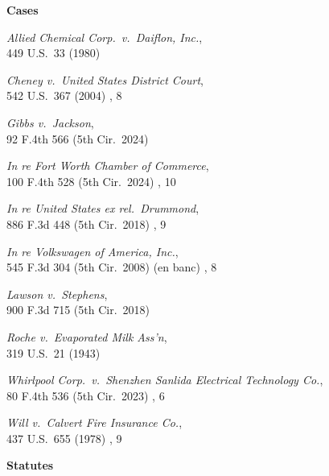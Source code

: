 \documentclass[14pt]{extarticle}
\begin{document}
\begin{singlespace}
\noindent\textbf{Cases}

\vspace{0.35em}
\noindent\textit{Allied Chemical Corp.\ v.\ Daiflon, Inc.},\\
\hspace{1.2em}449 U.S.\ 33 (1980) 

\noindent\textit{Cheney v.\ United States District Court},\\
\hspace{1.2em}542 U.S.\ 367 (2004) , 8

\noindent\textit{Gibbs v.\ Jackson},\\
\hspace{1.2em}92 F.4th 566 (5th Cir.\ 2024) 

\noindent\textit{In re Fort Worth Chamber of Commerce},\\
\hspace{1.2em}100 F.4th 528 (5th Cir.\ 2024) , 10

\noindent\textit{In re United States ex rel.\ Drummond},\\
\hspace{1.2em}886 F.3d 448 (5th Cir.\ 2018) , 9

\noindent\textit{In re Volkswagen of America, Inc.},\\
\hspace{1.2em}545 F.3d 304 (5th Cir.\ 2008) (en banc) , 8

\noindent\textit{Lawson v.\ Stephens},\\
\hspace{1.2em}900 F.3d 715 (5th Cir.\ 2018) 

\noindent\textit{Roche v.\ Evaporated Milk Ass'n},\\
\hspace{1.2em}319 U.S.\ 21 (1943) 

\noindent\textit{Whirlpool Corp.\ v.\ Shenzhen Sanlida Electrical Technology Co.},\\
\hspace{1.2em}80 F.4th 536 (5th Cir.\ 2023) , 6

\noindent\textit{Will v.\ Calvert Fire Insurance Co.},\\
\hspace{1.2em}437 U.S.\ 655 (1978) , 9

\vspace{0.55em}
\noindent\textbf{Statutes}


\end{singlespace}
\end{document}
